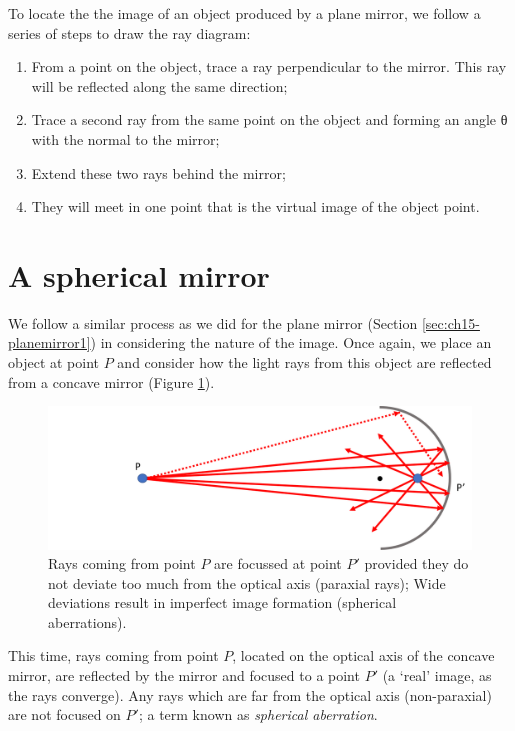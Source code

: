 \documentclass[
]{book}
\providecommand{\tightlist}{%
  \setlength{\itemsep}{0pt}\setlength{\parskip}{0pt}}
\begin{document}
To locate the the image of an object produced by a plane mirror, we follow a series of steps to draw the ray diagram:

\begin{enumerate}
\def\labelenumi{\arabic{enumi}.}
\tightlist
\item
  From a point on the object, trace a ray perpendicular to the mirror. This ray will be reflected along the same direction;
\item
  Trace a second ray from the same point on the object and forming an angle θ with the normal to the mirror;
\item
  Extend these two rays behind the mirror;
\item
  They will meet in one point that is the virtual image of the object point.
\end{enumerate}

\hypertarget{sec:ch15-sphericalmirror1}{%
\section{A spherical mirror}\label{sec:ch15-sphericalmirror1}}

We follow a similar process as we did for the plane mirror (Section \ref{sec:ch15-planemirror1}) in considering the nature of the image. Once again, we place an object at point \(P\) and consider how the light rays from this object are reflected from a concave mirror (Figure \ref{fig:ch15-sphericalconcave1}).\\

\begin{figure}

{\centering \includegraphics[width=0.7\linewidth]{visualisations/LaTeX/ch15-sphericalmirror1} 

}

\caption{Rays coming from point $P$ are focussed at point $P'$ provided they do not deviate too much from the optical axis (paraxial rays); Wide deviations result in imperfect image formation (spherical aberrations).}\label{fig:ch15-sphericalconcave1}
\end{figure}

This time, rays coming from point \(P\), located on the optical axis of the concave mirror, are reflected by the mirror and focused to a point \(P'\) (a `real' image, as the rays converge). Any rays which are far from the optical axis (non-paraxial) are not focused on \(P'\); a term known as \emph{spherical aberration}.
\end{document}
